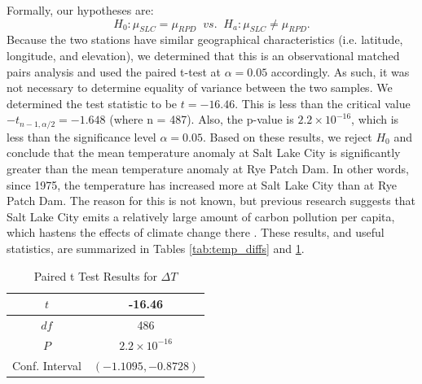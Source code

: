 Formally, our hypotheses are: $$ H_{0}: \mu_{SLC} = \mu_{RPD} \;\; vs. \;\; H_{a}: \mu_{SLC} \neq \mu_{RPD}.$$ Because the two stations have similar geographical characteristics (i.e. latitude, longitude, and elevation), we determined that this is an observational matched pairs analysis and used the paired t-test at $\alpha = 0.05$ accordingly. As such, it was not necessary to determine equality of variance between the two samples. We determined the test statistic to be $t = -16.46$. This is less than the critical value $-t_{n-1,\alpha/2} = -1.648$ (where n = 487). Also, the p-value is $2.2 \times 10^{-16}$, which is less than the significance level $\alpha = 0.05$. Based on these results, we reject $H_{0}$ and conclude that the mean temperature anomaly at Salt Lake City is significantly greater than the mean temperature anomaly at Rye Patch Dam. In other words, since 1975, the temperature has increased more at Salt Lake City than at Rye Patch Dam. The reason for this is not known, but previous research suggests that Salt Lake City emits a relatively large amount of carbon pollution per capita, which hastens the effects of climate change there \cite{obama_report}. These results, and useful statistics, are summarized in Tables \ref{tab:temp_diffs} and \ref{tab:t_test_results}.

\begin{table}[ht]
 \begin{centering}
 \caption{Temperature Difference Statistics}
 \label{tab:temp_diffs}
 \end{centering}
\end{table}

\begin{table}[ht]
 \begin{centering}
 \begin{tabular}{|c|c|} 
 \hline
  $t$ & -16.46 \\ 
 \hline
 $df$ & 486 \\
  \hline
 $P$ & $2.2 \times 10^{-16}$ \\ 
  \hline
 Conf. Interval & $(-1.1095, -0.8728)$ \\ 
 \hline
 \end{tabular}
 \caption{Paired t Test Results for $\Delta T$}
 \label{tab:t_test_results}
 \end{centering}
\end{table}

